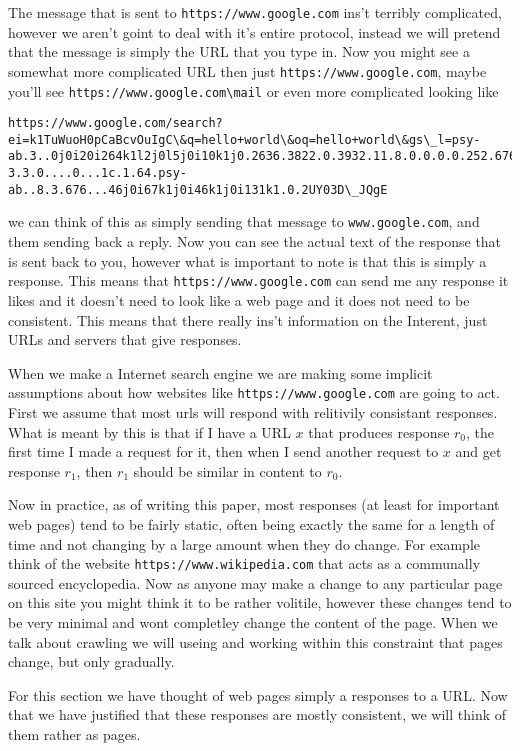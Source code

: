 \documentclass{article}
\begin{document}
	The message that is sent to \verb|https://www.google.com| ins't terribly complicated, however we aren't goint to deal with it's entire protocol, instead we will pretend that the message is simply the URL that you type in. Now you might see a somewhat more complicated URL then just \verb|https://www.google.com|, maybe you'll see \verb|https://www.google.com\mail| or even more complicated looking like
	\begin{lstlisting}[breaklines]
	https://www.google.com/search?ei=k1TuWuoH0pCaBcvOuIgC\&q=hello+world\&oq=hello+world\&gs\_l=psy-ab.3..0j0i20i264k1l2j0l5j0i10k1j0.2636.3822.0.3932.11.8.0.0.0.0.252.676.2-3.3.0....0...1c.1.64.psy-ab..8.3.676...46j0i67k1j0i46k1j0i131k1.0.2UY03D\_JQgE
	\end{lstlisting}
	we can think of this as simply sending that message to \verb|www.google.com|, and them sending back a reply. Now you can see the actual text of the response that is sent back to you, however what is important to note is that this is simply a response. This means that \verb|https://www.google.com| can send me any response it likes and it doesn't need to look like a web page and it does not need to be consistent. This means that there really ins't information on the Interent, just URLs and servers that give responses.
	
	When we make a Internet search engine we are making some implicit assumptions about how websites like \verb|https://www.google.com| are going to act. First we assume that most urls will respond with relitivily consistant responses. What is meant by this is that if I have a URL $x$ that produces response $r_0$, the first time I made a request for it, then when I send another request to $x$ and get response $r_1$, then $r_1$ should be similar in content to $r_0$.
	
	Now in practice, as of writing this paper, most responses (at least for important web pages) tend to be fairly static, often being exactly the same for a length of time and not changing by a large amount when they do change. For example think of the website \verb|https://www.wikipedia.com| that acts as a communally sourced encyclopedia. Now as anyone may make a change to any particular page on this site you might think it to be rather  volitile, however these changes tend to be very minimal and wont completley change the content of the page. When we talk about crawling we will useing and working within this constraint that pages change, but only gradually.
	
	For this section we have thought of web pages simply a responses to a URL. Now that we have justified that these responses are mostly consistent, we will think of them rather as pages.
	
\end{document}
